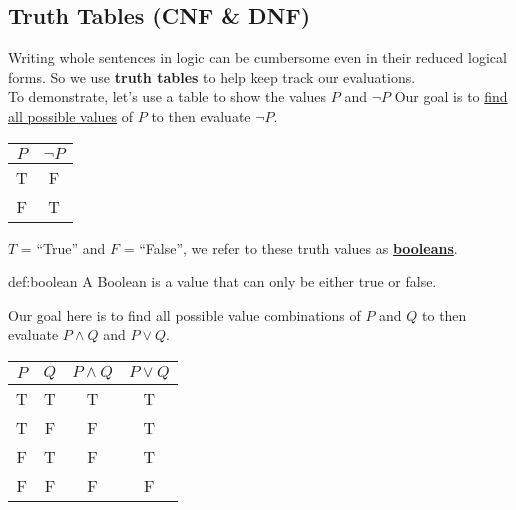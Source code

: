 \subsection{Truth Tables (CNF \& DNF)}
Writing whole sentences in logic can be cumbersome even in their reduced logical forms.
So we use \textbf{truth tables} to help keep track our evaluations.\\

\noindent
To demonstrate, let's use a table to show the values $P$ and $\neg P$ Our goal is to
\underline{find all possible values} of $P$ to then evaluate $\neg P$.

\begin{center}
    \begin{tabular}{|c|c|}
        \hline
        \rowcolor{OliveGreen!10}
        $P$ & $\neg P$ \\
        \hline
        T   & F        \\
        F   & T        \\
        \hline
    \end{tabular}
\end{center}
\noindent
$T$ = ``True'' and $F$ = ``False'', we refer to these truth values as \underline{\textbf{booleans}}.\\


\begin{Def}[Boolean]{def:boolean}
    A Boolean is a value that can only be either true or false.
\end{Def}

\newpage

\noindent
Our goal here is to find all possible value combinations of $P$ and $Q$ to then evaluate $P \land Q$ and $P \lor Q$.\\


\begin{center}
    \begin{tabular}{|c|c|c|c|}
        \hline
        \rowcolor{OliveGreen!10}
        $P$ & $Q$ & $P \land Q$ & $P \lor Q$ \\
        \hline
        T   & T   & T           & T          \\
        T   & F   & F           & T          \\
        F   & T   & F           & T          \\
        F   & F   & F           & F          \\
        \hline
    \end{tabular}
\end{center}

